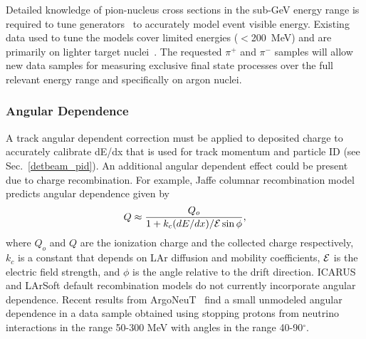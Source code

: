 Detailed knowledge of pion-nucleus cross sections in the sub-GeV energy range is required
to tune generators~\cite{genie} to accurately model event visible energy. 
Existing data used to tune the models
cover limited energies ($<$200~MeV) and are primarily on lighter target nuclei~\cite{fsirev}.
The requested $\pi^+$ and $\pi^-$ samples will allow new data samples for measuring
exclusive final state processes over the full relevant energy range and specifically on argon nuclei. 



 


\subsubsection{Angular Dependence}

\label{sec_angle}


A track angular dependent correction must be
applied to deposited charge to accurately calibrate
dE/dx that is used for track momentum and particle ID (see Sec.~\ref{detbeam_pid}). 
An additional angular dependent effect could be present 
due to charge recombination. 
For example, Jaffe columnar recombination model~\cite{jaffe,argoneut_angle} predicts 
angular dependence given by 
$$Q \approx \frac{Q_o}{1+k_c (dE/dx) / {\cal E} \sin\phi}, $$ 
where
$Q_o$ and $Q$ are the ionization charge and the collected charge respectively, 
$k_c$ is a constant that depends on LAr diffusion and mobility coefficients, $\cal E$ 
is the electric field strength, and $\phi$ is the angle relative to the drift direction.
%
ICARUS~\cite{icarus_recombination} and LArSoft default recombination models do not currently incorporate angular dependence. 
Recent results from ArgoNeuT~\cite{argoneut_angle} find a small unmodeled
angular dependence in a data sample obtained using stopping protons from 
neutrino interactions in the range 50-300 MeV with angles in the range 40-90$^{\circ}$.

